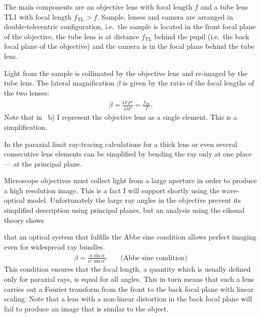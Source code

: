 The main components are an objective lens with focal length $f$ and a
 tube lens TL1 with focal length
$f_\textrm{TL}>f$. Sample, lenses and camera are arranged in
double-telecentric configuration, i.e.\ the sample is located in the
front focal plane of the objective, the tube lens is at distance
$f_\textrm{TL}$ behind the pupil (i.e.\ the back focal plane of the
objective) and the camera is in the focal plane behind the tube lens.




Light from the sample is collimated by the objective lens and
 re-imaged by the tube lens. The lateral
magnification $\beta$ is given by the ratio of the focal lengths of
the two lenses:
\begin{align}
  \beta=\frac{\overline{O'P'}}{\overline{OP}}=\frac{f_\mathrm{TL}}{f}.
\end{align}
Note that in ~b) I represent the
objective lens as a single element.  This is a simplification.

In the paraxial limit ray-tracing calculations for a thick lens or
even several consecutive lens elements can be simplified by bending
the ray only at one place --- at the principal plane.





Microscope objectives must collect light from a large aperture in
 order to produce a high
resolution image. This is a fact I will support shortly using the
wave-optical model. Unfortunately the large ray angles in the
objective prevent its simplified description using principal planes,
but an analysis using the eikonal theory \citep{Haferkorn1984} shows %


that an optical system that fulfills the Abbe sine condition allows
perfect imaging even for widespread ray bundles.
\begin{align}
  \label{eq:sine-condition}
  \beta = \frac{n \sin\alpha}{n' \sin\alpha'} \qquad \textrm{(Abbe sine condition)}
\end{align}
This condition ensures that the focal length, a quantity which is
usually defined only for paraxial rays, is equal for all angles.  This
in turn means that such a lens carries out a Fourier transform from
the front to the back focal plane with linear scaling. Note that a
lens with a non-linear distortion in the back focal plane will fail to
produce an image that is similar to the object.

